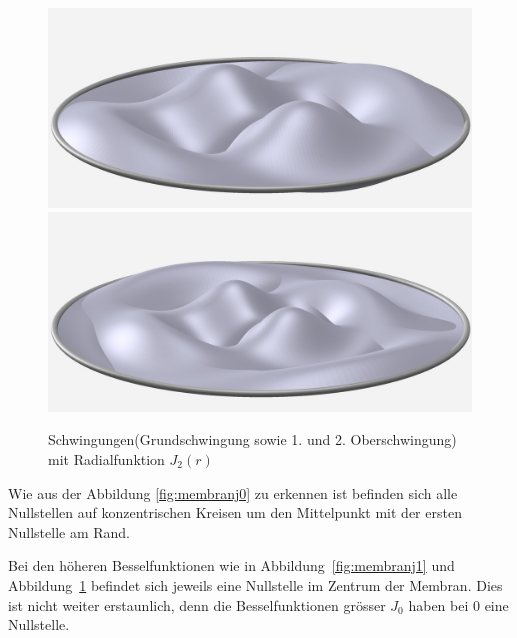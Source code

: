 \begin{figure}
        \includegraphics[width=0.33\hsize]{./kreis/membran/circle-2-2.jpg}
        \includegraphics[width=0.33\hsize]{./kreis/membran/circle-3-2.jpg}
        \caption{Schwingungen(Grundschwingung sowie 1. und 2. Oberschwingung) mit Radialfunktion $J_2(r)$}
        \label{fig:membranj2}
\end{figure}
Wie aus der Abbildung \ref{fig:membranj0} zu erkennen ist befinden sich alle Nullstellen auf konzentrischen Kreisen um den Mittelpunkt mit der ersten Nullstelle am Rand.

Bei den höheren Besselfunktionen wie in Abbildung~\ref{fig:membranj1} und Abbildung~\ref{fig:membranj2} befindet sich jeweils eine Nullstelle im Zentrum der Membran. Dies ist nicht weiter erstaunlich, denn die Besselfunktionen grösser $J_0$ haben bei 0 eine Nullstelle. 
